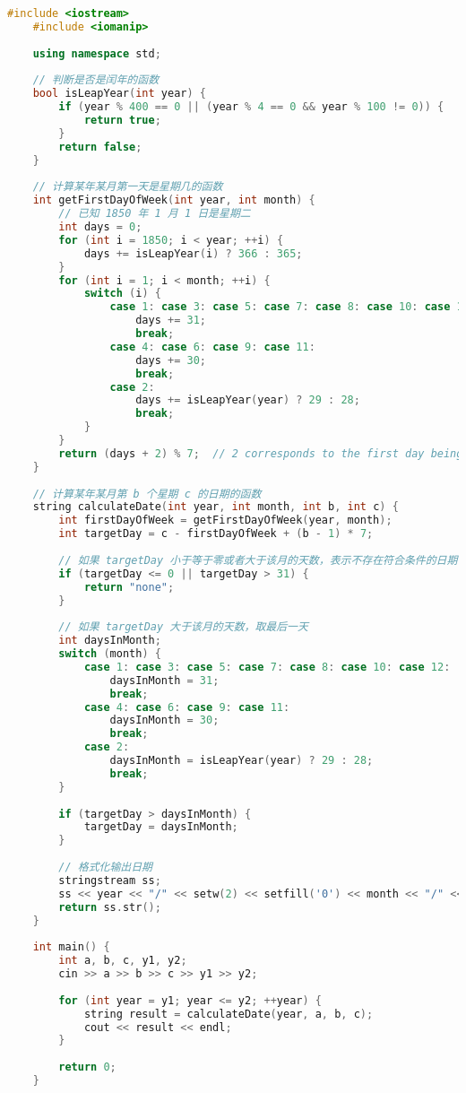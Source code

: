 \begin{lstlisting}[language=C++]
    #include <iostream>
    #include <iomanip>
    
    using namespace std;
    
    // 判断是否是闰年的函数
    bool isLeapYear(int year) {
        if (year % 400 == 0 || (year % 4 == 0 && year % 100 != 0)) {
            return true;
        }
        return false;
    }
    
    // 计算某年某月第一天是星期几的函数
    int getFirstDayOfWeek(int year, int month) {
        // 已知 1850 年 1 月 1 日是星期二
        int days = 0;
        for (int i = 1850; i < year; ++i) {
            days += isLeapYear(i) ? 366 : 365;
        }
        for (int i = 1; i < month; ++i) {
            switch (i) {
                case 1: case 3: case 5: case 7: case 8: case 10: case 12:
                    days += 31;
                    break;
                case 4: case 6: case 9: case 11:
                    days += 30;
                    break;
                case 2:
                    days += isLeapYear(year) ? 29 : 28;
                    break;
            }
        }
        return (days + 2) % 7;  // 2 corresponds to the first day being Tuesday
    }
    
    // 计算某年某月第 b 个星期 c 的日期的函数
    string calculateDate(int year, int month, int b, int c) {
        int firstDayOfWeek = getFirstDayOfWeek(year, month);
        int targetDay = c - firstDayOfWeek + (b - 1) * 7;
    
        // 如果 targetDay 小于等于零或者大于该月的天数，表示不存在符合条件的日期
        if (targetDay <= 0 || targetDay > 31) {
            return "none";
        }
    
        // 如果 targetDay 大于该月的天数，取最后一天
        int daysInMonth;
        switch (month) {
            case 1: case 3: case 5: case 7: case 8: case 10: case 12:
                daysInMonth = 31;
                break;
            case 4: case 6: case 9: case 11:
                daysInMonth = 30;
                break;
            case 2:
                daysInMonth = isLeapYear(year) ? 29 : 28;
                break;
        }
    
        if (targetDay > daysInMonth) {
            targetDay = daysInMonth;
        }
    
        // 格式化输出日期
        stringstream ss;
        ss << year << "/" << setw(2) << setfill('0') << month << "/" << setw(2) << setfill('0') << targetDay;
        return ss.str();
    }
    
    int main() {
        int a, b, c, y1, y2;
        cin >> a >> b >> c >> y1 >> y2;
    
        for (int year = y1; year <= y2; ++year) {
            string result = calculateDate(year, a, b, c);
            cout << result << endl;
        }
    
        return 0;
    }    
\end{lstlisting}